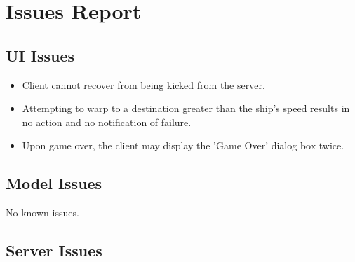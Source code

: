 \chapter{Issues Report}

\section{UI Issues}
\begin{itemize}
    \item Client cannot recover from being kicked from the server.
    \item Attempting to warp to a destination greater than the ship's speed results in no action and no notification of failure.
    \item Upon game over, the client may display the 'Game Over' dialog box twice.
\end{itemize}

\section{Model Issues}
No known issues.

\section{Server Issues}
